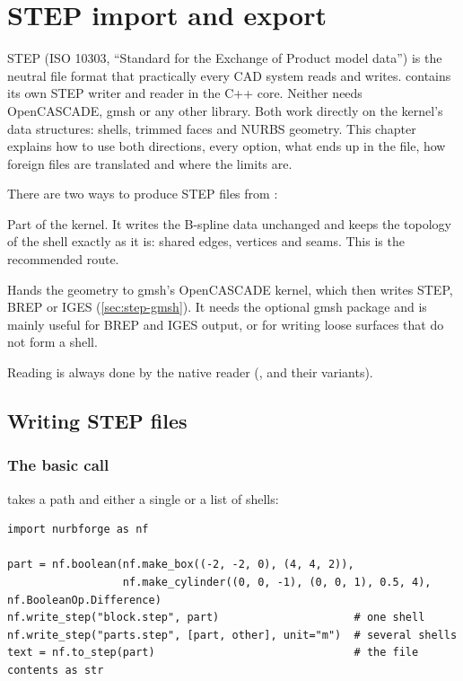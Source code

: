 \chapter{STEP import and export}\label{ch:step}

STEP (ISO 10303, ``Standard for the Exchange of Product model data'') is the neutral file
format that practically every CAD system reads and writes. \NF{} contains its own STEP writer
and reader in the C++ core. Neither needs OpenCASCADE, gmsh or any other library. Both work
directly on the kernel's data structures: shells, trimmed faces and NURBS geometry. This
chapter explains how to use both directions, every option, what ends up in the file, how
foreign files are translated and where the limits are.

There are two ways to produce STEP files from \NF{}:

\begin{description}[leftmargin=1.5em, style=nextline]
  \item[Native writer (\apiref{write_step}, \apiref{to_step})] Part of the kernel. It writes the
    B-spline data unchanged and keeps the topology of the shell exactly as it is: shared edges,
    vertices and seams. This is the recommended route.
  \item[gmsh route (\apiref{mesh.export_step})] Hands the geometry to gmsh's OpenCASCADE kernel,
    which then writes STEP, BREP or IGES (\cref{sec:step-gmsh}). It needs the optional gmsh
    package and is mainly useful for BREP and IGES output, or for writing loose surfaces that
    do not form a shell.
\end{description}

Reading is always done by the native reader (,  and their
 variants).

\section{Writing STEP files}\label{sec:step-write}

\subsection{The basic call}

 takes a path and either a single  or a list of shells:

\begin{lstlisting}[style=python]
import nurbforge as nf

part = nf.boolean(nf.make_box((-2, -2, 0), (4, 4, 2)),
                  nf.make_cylinder((0, 0, -1), (0, 0, 1), 0.5, 4), nf.BooleanOp.Difference)
nf.write_step("block.step", part)                     # one shell
nf.write_step("parts.step", [part, other], unit="m")  # several shells
text = nf.to_step(part)                               # the file contents as str
\end{lstlisting}

